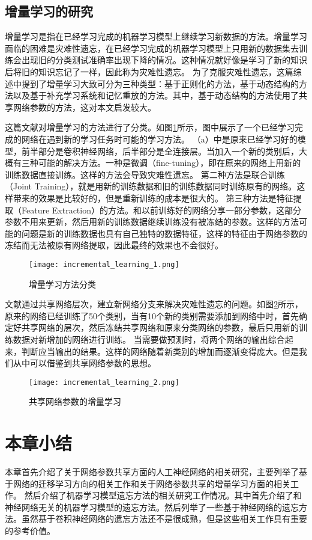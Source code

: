 \subsection{增量学习的研究}
增量学习是指在已经学习完成的机器学习模型上继续学习新数据的方法。增量学习面临的困难是灾难性遗忘，在已经学习完成的机器学习模型上只用新的数据集去训练会出现旧的分类测试准确率出现下降的情况。这种情况就好像是学习了新的知识后将旧的知识忘记了一样，因此称为灾难性遗忘。
为了克服灾难性遗忘，这篇综述\cite{PARISI201954}中提到了增量学习大致可分为三种类型：基于正则化的方法，基于动态结构的方法以及基于补充学习系统和记忆重放的方法。其中，基于动态结构的方法使用了共享网络参数的方法，这对本文启发较大。

这篇文献\cite{8107520}对增量学习的方法进行了分类。如图\ref{fig:incremental_learning_1}所示，图中展示了一个已经学习完成的网络在遇到新的学习任务时可能的学习方法。
（a）中是原来已经学习好的模型，前半部分是卷积神经网络，后半部分是全连接层。当加入一个新的类别后，大概有三种可能的解决方法。一种是微调（fine-tuning），即在原来的网络上用新的训练数据直接训练。这样的方法会导致灾难性遗忘。
第二种方法是联合训练（Joint Training），就是用新的训练数据和旧的训练数据同时训练原有的网络。这样带来的效果是比较好的，但是重新训练的成本是很大的。
第三种方法是特征提取（Feature Extraction）的方法。和以前训练好的网络分享一部分参数，这部分参数不用来更新，然后用新的训练数据继续训练没有被冻结的参数。这样的方法可能的问题是新的训练数据也具有自己独特的数据特征，这样的特征由于网络参数的冻结而无法被原有网络提取，因此最终的效果也不会很好。
\begin{figure}
    \centering
    \texttt{[image: incremental\_learning\_1.png]}
    \caption{增量学习方法分类\cite{8107520}}
    \label{fig:incremental_learning_1}
\end{figure}

文献\cite{Sarwar_2020}通过共享网络层次，建立新网络分支来解决灾难性遗忘的问题。如图\ref{fig:incremental_learning_2}所示，原来的网络已经训练了50个类别，当有10个新的类别需要添加到网络中时，首先确定好共享网络的层次，然后冻结共享网络和原来分类网络的参数，最后只用新的训练数据对新增加的网络进行训练。
当需要做预测时，将两个网络的输出综合起来，判断应当输出的结果。这样的网络随着新类别的增加而逐渐变得庞大。但是我们从中可以借鉴到共享网络参数的思想。
\begin{figure}
    \centering
    \texttt{[image: incremental\_learning\_2.png]}
    \caption{共享网络参数的增量学习\cite{Sarwar_2020}}
    \label{fig:incremental_learning_2}
\end{figure}


\section{本章小结}
本章首先介绍了关于网络参数共享方面的人工神经网络的相关研究，主要列举了基于网络的迁移学习方向的相关工作和关于网络参数共享的增量学习方面的相关工作。
然后介绍了机器学习模型遗忘方法的相关研究工作情况。其中首先介绍了和神经网络无关的机器学习模型的遗忘方法。然后列举了一些基于神经网络的遗忘方法。虽然基于卷积神经网络的遗忘方法还不是很成熟，但是这些相关工作具有重要的参考价值。